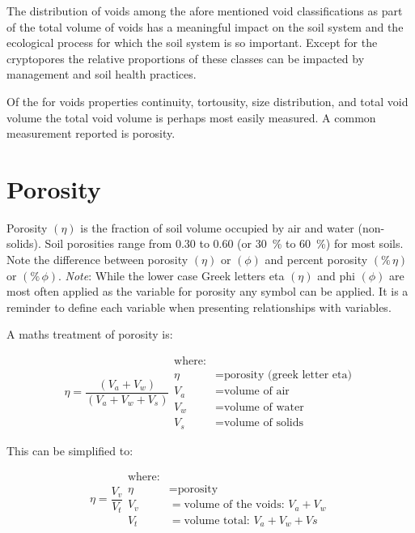 \documentclass[a5paper]{report}
\begin{document}
The distribution of voids among the afore mentioned void classifications as part of the total volume of voids has a meaningful impact on the soil system and the ecological process for which the soil system is so important. Except for the cryptopores the relative proportions of these classes can be impacted by management and soil health practices.  

Of the for voids properties continuity, tortousity, size distribution, and total void volume the total void volume is perhaps most easily measured. A common measurement reported is porosity.  

\section{Porosity}
\label{porosity}

Porosity $\left(\eta\right)$ is the fraction of soil volume occupied by air and water (non-solids). Soil porosities range from 0.30 to 0.60 (or \qty[]{30}{\percent} to \qty[]{60}{\percent}) for most soils. Note the difference between porosity $\left(\eta\right)$ or $\left(\phi\right)$ and percent porosity $\left(\%\,\eta\right)$ or $\left(\%\,\phi\right)$. \emph{Note}: While the lower case Greek letters eta $\left(\eta\right)$ and phi $\left(\phi\right)$ are most often applied as the variable for porosity any symbol can be applied. It is a reminder to define each variable when presenting relationships with variables. 

A maths treatment of porosity is:

\begin{equation}
    \eta = \frac{\left(V_a + V_w\right)}{\left(V_a + V_w + V_s\right)}
    \begin{aligned}
        \text{where:}\\
        \eta &= \text{porosity (greek letter eta)}\\
        V_a &= \text{volume of air}\\
        V_w &= \text{volume of water}\\
        V_s &= \text{volume of solids}
    \end{aligned}
\end{equation}

This can be simplified to:

\begin{equation}
    \eta = \frac{V_v}{V_t}
    \begin{aligned}
        \text{where:}\\
        \eta &= \text{porosity}\\
        V_v &= \text{volume of the voids}:\,V_a+V_w\\
        V_t &= \text{volume total}:\,V_a+V_w+Vs
    \end{aligned}
\end{equation}
\end{document}
